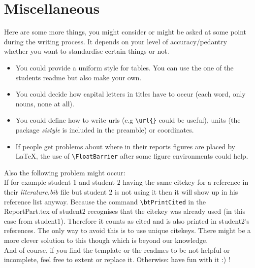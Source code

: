 \documentclass[12pt,a4paper,notitlepage]{scrreprt}
\begin{document}
\section{Miscellaneous}

Here are some more things, you might consider or might be asked at some point during the writing process. It depends on your level of accuracy/pedantry whether you want to standardise certain things or not.

\begin{itemize}
	\item You could provide a uniform style for tables. You can use the one of the students readme but also make your own.
	\item You could decide how capital letters in titles have to occur (each word, only nouns, none at all).
	\item You could define how to write urls (e.g \verb#\url{}# could be useful), units (the package \textit{sistyle} is included in the preamble) or coordinates.
	\item If people get problems about where in their reports figures are placed by \LaTeX, the use of \verb#\FloatBarrier# after some figure environments could help.
\end{itemize}

Also the following problem might occur:\\
If for example student 1 and student 2 having the same citekey for a reference in their \textit{literature.bib} file but student 2 is not using it then it will show up in his reference list anyway. Because the command \verb#\btPrintCited#  in the ReportPart.tex of student2 recognises that the citekey was already used (in this case from student1).  Therefore it counts as cited and is also printed in student2's references. The only way to avoid this is to use unique citekeys. There might be a more clever solution to this though which is beyond our knowledge.\\

And of course, if you find the template or the readmes to be not helpful or incomplete, feel free to extent or replace it. Otherwise: have fun with it :) !\\
\end{document}
